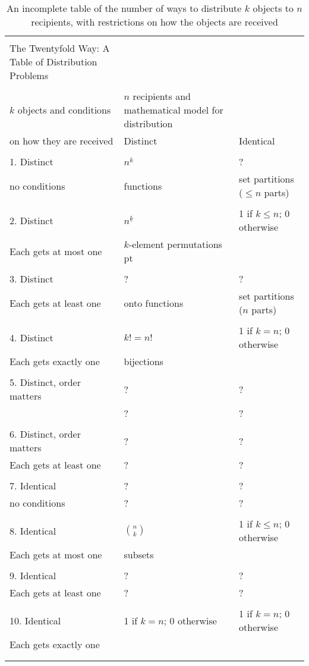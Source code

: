 \documentclass[10pt,]{book}
\theoremstyle{plain}
\theoremstyle{definition}
\numberwithin{equation}{chapter}
\newcommand{\hrulethin}  {\noalign{\hrule height 0.04em}}
\newcommand{\hrulemedium}{\noalign{\hrule height 0.07em}}
\begin{document}
\begin{table}
\centering
\begin{tabular}{lll}
&&\tabularnewline\hrulethin
The Twentyfold Way: A Table of Distribution Problems\tabularnewline[0pt]
&&\tabularnewline\hrulemedium
\(k\) objects and conditions&\(n\) recipients and mathematical model for distribution\tabularnewline[0pt]
on how they are received&Distinct&Identical\tabularnewline[0pt]
&&\tabularnewline\hrulemedium
1.  Distinct&\(n^k\)&?\tabularnewline[0pt]
no conditions&functions&set partitions (\(\le n\) parts)\tabularnewline[0pt]
&&\tabularnewline\hrulethin
2.  Distinct&\(n^{\underline{k}}\)&1 if \(k\le n\); 0 otherwise\tabularnewline[0pt]
Each gets at most one&\kern -2pt \(k\)-element permutations\kern -2 pt&\tabularnewline[0pt]
&&\tabularnewline\hrulethin
3.  Distinct&?&?\tabularnewline[0pt]
Each gets at least one&onto functions&set partitions (\(n\) parts)\tabularnewline[0pt]
&&\tabularnewline\hrulethin
4. Distinct&\(k!=n!\)&1 if \(k=n\); 0 otherwise\tabularnewline[0pt]
Each gets exactly one&bijections&\tabularnewline[0pt]
&&\tabularnewline\hrulethin
5.  Distinct, order matters&?&?\tabularnewline[0pt]
&?&?\tabularnewline[0pt]
&&\tabularnewline\hrulethin
6.  Distinct, order matters&?&?\tabularnewline[0pt]
Each gets at least one&?&?\tabularnewline[0pt]
&&\tabularnewline\hrulethin
7.  Identical&?&?\tabularnewline[0pt]
no conditions&?&?\tabularnewline[0pt]
&&\tabularnewline\hrulethin
8.  Identical&\(n\choose k\)&1 if \(k\le n\); 0 otherwise\tabularnewline[0pt]
Each gets at most one&subsets&\tabularnewline[0pt]
&&\tabularnewline\hrulethin
9.  Identical&?&?\tabularnewline[0pt]
Each gets at least one&?&?\tabularnewline[0pt]
&&\tabularnewline\hrulethin
10.  Identical&1 if \(k=n\); 0 otherwise&1 if \(k=n\); 0 otherwise\tabularnewline[0pt]
Each gets exactly one&&\tabularnewline[0pt]
&&\tabularnewline\hrulethin
\end{tabular}
\caption{An incomplete table of the number of ways to distribute \(k\) objects to \(n\) recipients, with restrictions on how the objects are received\label{firstdistributiontable}}
\end{table}
\end{document}
